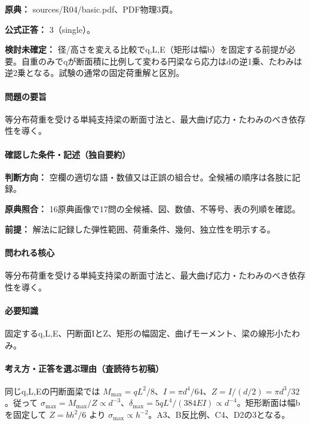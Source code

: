 \noindent\textbf{原典：} sources/R04/basic.pdf、PDF物理3頁。

\textbf{公式正答：} 3（single）。

\par\textbf{検討未確定：} 径/高さを変える比較でq,L,E（矩形は幅b）を固定する前提が必要。自重のみでqが断面積に比例して変わる円梁なら応力はdの逆1乗、たわみは逆2乗となる。試験の通常の固定荷重解と区別。

\paragraph{問題の要旨} 等分布荷重を受ける単純支持梁の断面寸法と、最大曲げ応力・たわみのべき依存性を導く。

\paragraph{確認した条件・記述（独自要約）}\mbox{}\par

\noindent\textbf{判断方向：} 空欄の適切な語・数値又は正誤の組合せ。全候補の順序は各肢に記録。\par

\noindent\textbf{原典照合：} 16原典画像で17問の全候補、図、数値、不等号、表の列順を確認。\par

\noindent\textbf{前提：} 解法に記録した弾性範囲、荷重条件、幾何、独立性を明示する。\par

\paragraph{問われる核心} 等分布荷重を受ける単純支持梁の断面寸法と、最大曲げ応力・たわみのべき依存性を導く。

\paragraph{必要知識} 固定するq,L,E、円断面IとZ、矩形の幅固定、曲げモーメント、梁の線形小たわみ。

\paragraph{考え方・正答を選ぶ理由（査読待ち初稿）} 同じq,L,Eの円断面梁では \(M_{\max}=qL^2/8\)、\(I=\pi d^4/64\)、\(Z=I/(d/2)=\pi d^3/32\)。従って \(\sigma_{\max}=M_{\max}/Z\propto d^{-3}\)、\(\delta_{\max}=5qL^4/(384EI)\propto d^{-4}\)。矩形断面は幅bを固定して \(Z=bh^2/6\) より \(\sigma_{\max}\propto h^{-2}\)。A3、B反比例、C4、D2の3となる。

